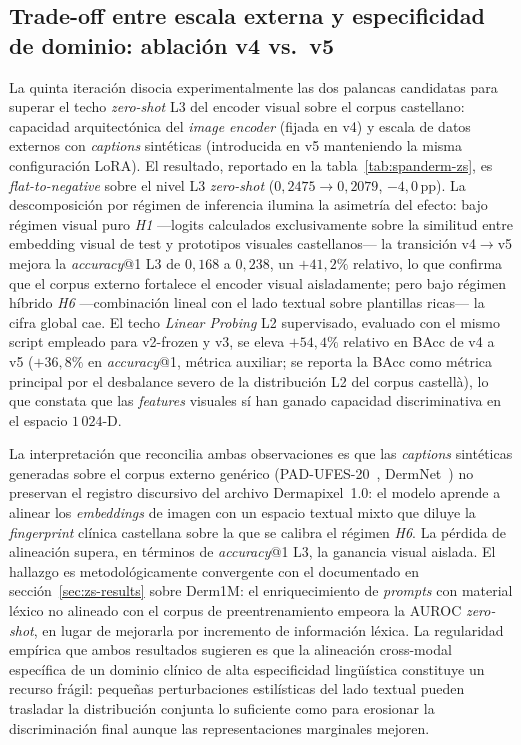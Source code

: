 \subsection*{Trade-off entre escala externa y especificidad de
dominio: ablación v4 vs.~v5}
\label{sec:spanderm-escala-especificidad}

La quinta iteración disocia experimentalmente las dos palancas
candidatas para superar el techo \emph{zero-shot} L3 del encoder
visual sobre el corpus castellano: capacidad arquitectónica del
\emph{image encoder} (fijada en v4) y escala de datos externos
con \emph{captions} sintéticas (introducida en v5 manteniendo la
misma configuración LoRA). El resultado, reportado en la
tabla~\ref{tab:spanderm-zs}, es \emph{flat-to-negative} sobre el
nivel L3 \emph{zero-shot} ($0{,}2475 \to 0{,}2079$, $-4{,}0$\,pp).
La descomposición por régimen de inferencia ilumina la asimetría
del efecto: bajo régimen visual puro \emph{H1} ---logits
calculados exclusivamente sobre la similitud entre embedding
visual de test y prototipos visuales castellanos--- la transición
v4$\to$v5 mejora la \emph{accuracy}@1 L3 de $0{,}168$ a $0{,}238$,
un $+41{,}2\%$ relativo, lo que confirma que el corpus externo
fortalece el encoder visual aisladamente; pero bajo régimen
híbrido \emph{H6} ---combinación lineal con el lado textual
sobre plantillas ricas--- la cifra global cae. El techo
\emph{Linear Probing} L2 supervisado, evaluado con el mismo
script empleado para v2-frozen y v3, se eleva $+54{,}4\%$ relativo
en BAcc de v4 a v5 ($+36{,}8\%$ en \emph{accuracy}@1, métrica
auxiliar; se reporta la BAcc como métrica principal por el
desbalance severo de la distribución L2 del corpus castellà),
lo que constata que las \emph{features}
visuales sí han ganado capacidad discriminativa en el espacio
$1\,024$-D.

La interpretación que reconcilia ambas observaciones es que las
\emph{captions} sintéticas generadas sobre el corpus externo
genérico (PAD-UFES-20~\cite{padufes}, DermNet~\cite{dermnet}) no
preservan el registro discursivo del archivo
Dermapixel~1.0: el modelo aprende a alinear los \emph{embeddings}
de imagen con un espacio textual mixto que diluye la
\emph{fingerprint} clínica castellana sobre la que se calibra el
régimen \emph{H6}. La pérdida de alineación supera, en términos
de \emph{accuracy}@1 L3, la ganancia visual aislada. El hallazgo
es metodológicamente convergente con el documentado en
secci\'on~\ref{sec:zs-results} sobre Derm1M: el enriquecimiento de
\emph{prompts} con material léxico no alineado con el corpus de
preentrenamiento empeora la AUROC \emph{zero-shot}, en lugar de
mejorarla por incremento de información léxica. La regularidad
empírica que ambos resultados sugieren es que la alineación
cross-modal específica de un dominio clínico de alta
especificidad lingüística constituye un recurso frágil: pequeñas
perturbaciones estilísticas del lado textual pueden trasladar la
distribución conjunta lo suficiente como para erosionar la
discriminación final aunque las representaciones marginales
mejoren.

